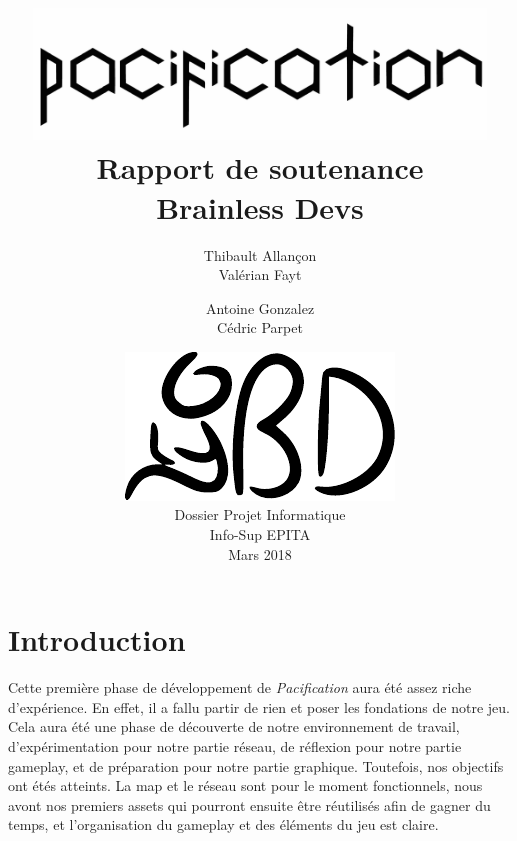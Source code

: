 \documentclass[12pt]{report}
\begin{document}
\title{
	{\vspace{3em}\protect\centering\protect\includegraphics[width=0.9\textwidth]{pacification_vector.pdf}}\\
	{\vspace{4em}\Huge Rapport de soutenance}\\
	{\large Brainless Devs}
}
\author{
	Thibault Allançon\\
	Valérian Fayt
	\and
	Antoine Gonzalez\\
	Cédric Parpet}
\date{
	{\vfill\protect\centering\protect\includegraphics{logo_short_vector.pdf}}\\
	Dossier Projet Informatique\\
	Info-Sup EPITA\\
	Mars 2018
}

\maketitle
\tableofcontents

\chapter{Introduction}

Cette première phase de développement de \textit{Pacification} aura été assez riche d'expérience. En effet, il a fallu partir de rien et poser les fondations de notre jeu. Cela aura été une phase de découverte de notre environnement de travail, d'expérimentation pour notre partie réseau, de réflexion pour notre partie gameplay, et de préparation pour notre partie graphique. Toutefois, nos objectifs ont étés atteints. La map et le réseau sont pour le moment fonctionnels, nous avont nos premiers assets qui pourront ensuite être réutilisés afin de gagner du temps, et l'organisation du gameplay et des éléments du jeu est claire.
\end{document}
